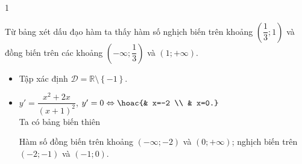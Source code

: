 \begin{bt}
{\begin{enumEX}{1}
\begin{center}
			\end{center}
			Từ bảng xét dấu đạo hàm ta thấy hàm số  nghịch biến trên khoảng $\left(\dfrac{1}{3};1\right)$ và đồng biến trên các khoảng $\left(-\infty;\dfrac{1}{3}\right)$ và $(1;+\infty)$.
			\item \begin{itemize}
			\item Tập xác định  $\mathscr{D}=\mathbb{R}\setminus \left\{-1\right\}$.
			\item $y'=\dfrac{x^2+2x}{(x+1)^2}$, $y'=0\Leftrightarrow \hoac{&  x=-2 \\ & x=0.}$\\
			Ta có  bảng biến thiên
			\begin{center}
			\end{center}
			Hàm số đồng biến trên khoảng  $\left( -\infty;-2\right)$ và $\left( 0;+\infty\right)$; nghịch biến trên $(-2;-1)$ và $(-1;0)$.
		\end{itemize}
	\end{enumEX}
 }
\end{bt}

